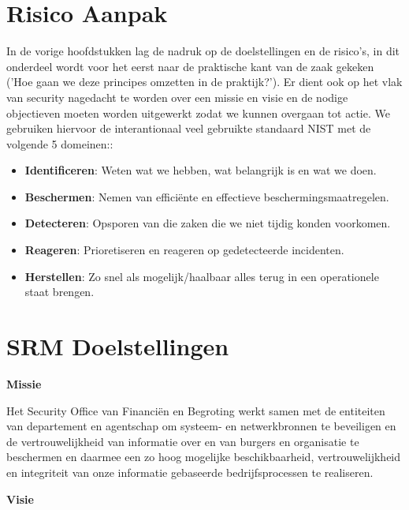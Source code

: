 \documentclass[11pt]{article}
\begin{document}
\section{Risico Aanpak}
\label{sec:org0b5f26e}
In de vorige hoofdstukken lag de nadruk op de doelstellingen en de risico's, in dit onderdeel wordt voor het eerst naar de praktische kant van de zaak gekeken ('Hoe gaan we deze principes omzetten in de praktijk?').
Er dient ook op het vlak van security nagedacht te worden over een missie en visie en de nodige objectieven moeten worden uitgewerkt zodat we kunnen overgaan tot actie. We gebruiken hiervoor de interantionaal veel gebruikte standaard NIST met de volgende 5 domeinen::
\begin{itemize}
\item \textbf{Identificeren}: Weten wat we hebben, wat belangrijk is en wat we doen.
\item \textbf{Beschermen}: Nemen van efficiënte en effectieve beschermingsmaatregelen.
\item \textbf{Detecteren}: Opsporen van die zaken die we niet tijdig konden voorkomen.
\item \textbf{Reageren}: Prioretiseren en reageren op gedetecteerde incidenten.
\item \textbf{Herstellen}: Zo snel als mogelijk/haalbaar alles terug in een operationele staat brengen.
\end{itemize}

\section{SRM Doelstellingen}
\label{sec:orga5bf253}

\textbf{Missie}

Het Security Office van Financiën en Begroting werkt samen met de entiteiten van departement en agentschap om systeem- en netwerkbronnen te beveiligen en de vertrouwelijkheid van informatie over en van burgers en organisatie te beschermen en daarmee een zo hoog mogelijke beschikbaarheid, vertrouwelijkheid en integriteit van onze informatie gebaseerde bedrijfsprocessen te realiseren.

\textbf{Visie}
\end{document}
